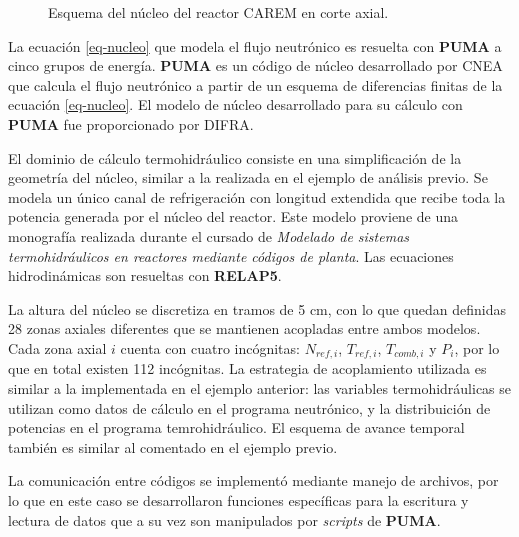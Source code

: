 \begin{figure}

\caption[Esquema del núcleo del reactor CAREM en corte axial]
{Esquema del núcleo del reactor CAREM en corte axial.}
\label{carem}
\end{figure}
La ecuación \ref{eq-nucleo} que modela el flujo neutrónico es resuelta con \textbf{PUMA} \cite{puma} a cinco grupos de energía.
\textbf{PUMA} es un código de núcleo desarrollado por CNEA que calcula el flujo neutrónico a partir de un esquema de diferencias finitas de la ecuación \ref{eq-nucleo}.
El modelo de núcleo desarrollado para su cálculo con \textbf{PUMA} fue proporcionado por DIFRA.

El dominio de cálculo termohidráulico consiste en una simplificación de la geometría del núcleo, similar a la realizada en el ejemplo de análisis previo.
Se modela un único canal de refrigeración con longitud extendida que recibe toda la potencia generada por el núcleo del reactor.
Este modelo proviene de una monografía \cite{relap-carem} realizada durante el cursado de \textit{Modelado de sistemas termohidráulicos en reactores mediante códigos de planta}.
Las ecuaciones hidrodinámicas son resueltas con \textbf{RELAP5}.

La altura del núcleo se discretiza en tramos de 5 cm, con lo que quedan definidas 28 zonas axiales diferentes que se mantienen acopladas entre ambos modelos.
Cada zona axial $i$ cuenta con cuatro incógnitas: $N_{ref,i}$, $T_{ref,i}$, $T_{comb,i}$ y $P_i$, por lo que en total existen 112 incógnitas.
La estrategia de acoplamiento utilizada es similar a la implementada en el ejemplo anterior:
las variables termohidráulicas se utilizan como datos de cálculo en el programa neutrónico, y la distribuición de potencias en el programa temrohidráulico.
El esquema de avance temporal también es similar al comentado en el ejemplo previo.

La comunicación entre códigos se implementó mediante manejo de archivos,
por lo que en este caso se desarrollaron funciones específicas para la escritura y lectura de datos que a su vez son manipulados por \textit{scripts} de \textbf{PUMA}.

